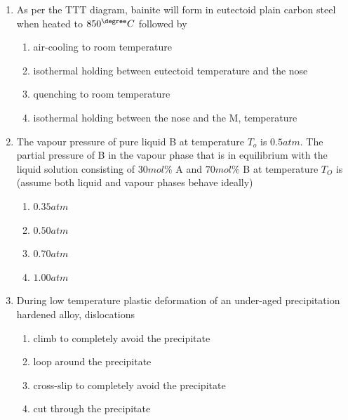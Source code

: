 \documentclass[journal]{IEEEtran}
\theoremstyle{remark}
\begin{document}
\begin{enumerate}
\item As per the TTT diagram, bainite will form in eutectoid plain carbon steel when heated to $850^\degree C$ followed by\hfill{}


\begin{enumerate}
\item  air-cooling to room temperature
\item  isothermal holding between eutectoid temperature and the nose
\item  quenching to room temperature
\item  isothermal holding between the nose and the M, temperature
\end{enumerate}

\item   The vapour pressure of pure liquid B at temperature $T_o$ is $0.5 atm$. The partial pressure of B in the
vapour phase that is in equilibrium with the liquid solution consisting of $30 mol\%$ A and $70 mol\%$ B at
temperature $T_O$ is (assume both liquid and vapour phases behave ideally)

\hfill{}
\begin{multicols}{4}
\begin{enumerate}
\item  $0.35 atm$
\item $0.50 atm$
\item  $0.70 atm$
\item  $1.00 atm$
\end{enumerate}
\end{multicols}

\item  During low temperature plastic deformation of an under-aged precipitation hardened alloy, dislocations \hfill{}
\begin{enumerate}
\item  climb to completely avoid the precipitate
\item loop around the precipitate
\item  cross-slip to completely avoid the precipitate
\item  cut through the precipitate
\end{enumerate}


\end{enumerate}
\end{document}
